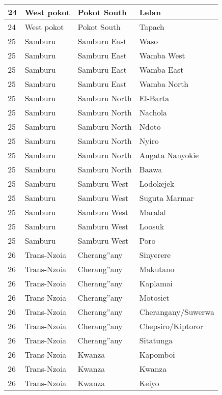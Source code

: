 \begin{table}[!ht]
\begin{tabular}{|l|l|l|l|}
        24 & West pokot & Pokot South & Lelan \\ \hline
        24 & West pokot & Pokot South & Tapach \\ \hline
        25 & Samburu & Samburu East & Waso \\ \hline
        25 & Samburu & Samburu East & Wamba West \\ \hline
        25 & Samburu & Samburu East & Wamba East \\ \hline
        25 & Samburu & Samburu East & Wamba North \\ \hline
        25 & Samburu & Samburu North & El-Barta \\ \hline
        25 & Samburu & Samburu North & Nachola \\ \hline
        25 & Samburu & Samburu North & Ndoto \\ \hline
        25 & Samburu & Samburu North & Nyiro \\ \hline
        25 & Samburu & Samburu North & Angata Nanyokie \\ \hline
        25 & Samburu & Samburu North & Baawa \\ \hline
        25 & Samburu & Samburu West & Lodokejek \\ \hline
        25 & Samburu & Samburu West & Suguta Marmar \\ \hline
        25 & Samburu & Samburu West & Maralal \\ \hline
        25 & Samburu & Samburu West & Loosuk \\ \hline
        25 & Samburu & Samburu West & Poro \\ \hline
        26 & Trans-Nzoia & Cherang''any & Sinyerere \\ \hline
        26 & Trans-Nzoia & Cherang''any & Makutano \\ \hline
        26 & Trans-Nzoia & Cherang''any & Kaplamai \\ \hline
        26 & Trans-Nzoia & Cherang''any & Motosiet \\ \hline
        26 & Trans-Nzoia & Cherang''any & Cherangany/Suwerwa \\ \hline
        26 & Trans-Nzoia & Cherang''any & Chepsiro/Kiptoror \\ \hline
        26 & Trans-Nzoia & Cherang''any & Sitatunga \\ \hline
        26 & Trans-Nzoia & Kwanza & Kapomboi \\ \hline
        26 & Trans-Nzoia & Kwanza & Kwanza \\ \hline
        26 & Trans-Nzoia & Kwanza & Keiyo \\ \hline

\end{tabular}
\end{table}
